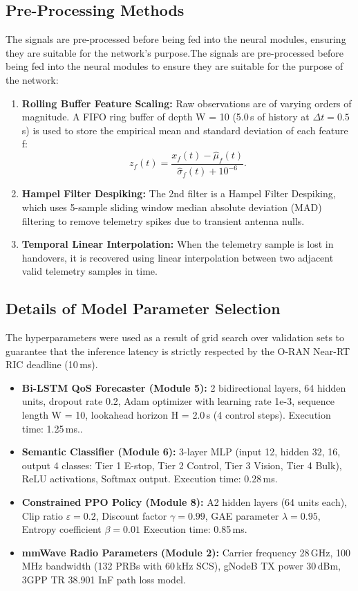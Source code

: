 \documentclass[twocolumn,10pt,twoside]{article}
\begin{document}
\subsection{Pre-Processing Methods}
The signals are pre-processed before being fed into the neural modules, ensuring they are suitable for the network's purpose.The signals are pre-processed before being fed into the neural modules to ensure they are suitable for the purpose of the network:
\begin{enumerate}
    \item \textbf{Rolling Buffer Feature Scaling:} Raw observations are of varying orders of magnitude. A FIFO ring buffer of depth W = 10 (5.0\,s of history at $\Delta t = 0.5$\,s) is used to store the empirical mean and standard deviation of each feature f:
\begin{equation}
z_f(t) = \frac{x_f(t) - \hat{\mu}_f(t)}{\hat{\sigma}_f(t) + 10^{-6}}.
\label{eq:rolling_scaling}
\end{equation}
    \item \textbf{Hampel Filter Despiking:} The 2nd filter is a Hampel Filter Despiking, which uses 5-sample sliding window median absolute deviation (MAD) filtering to remove telemetry spikes due to transient antenna nulls.
    \item \textbf{Temporal Linear Interpolation:} When the telemetry sample is lost in handovers, it is recovered using linear interpolation between two adjacent valid telemetry samples in time.
\end{enumerate}

\subsection{Details of Model Parameter Selection}
The hyperparameters were used as a result of grid search over validation sets to guarantee that the inference latency is strictly respected by the O-RAN Near-RT RIC deadline (10\,ms).
\begin{itemize}
    \item \textbf{Bi-LSTM QoS Forecaster (Module 5):} 2 bidirectional layers, 64 hidden units, dropout rate 0.2, Adam optimizer with learning rate 1e-3, sequence length W = 10, lookahead horizon H = 2.0\,s (4 control steps). Execution time: 1.25\,ms..
    \item \textbf{Semantic Classifier (Module 6):} 3-layer MLP (input 12, hidden 32, 16, output 4 classes: Tier 1 E-stop, Tier 2 Control, Tier 3 Vision, Tier 4 Bulk), ReLU activations, Softmax output. Execution time: 0.28\,ms.
    \item \textbf{Constrained PPO Policy (Module 8):} A2 hidden layers (64 units each), Clip ratio $\varepsilon = 0.2$, Discount factor $\gamma = 0.99$, GAE parameter $\lambda = 0.95$, Entropy coefficient $\beta = 0.01$ Execution time: 0.85\,ms.
    \item \textbf{mmWave Radio Parameters (Module 2):} Carrier frequency 28\,GHz, 100\,MHz bandwidth (132 PRBs with 60\,kHz SCS), gNodeB TX power 30\,dBm, 3GPP TR 38.901 InF path loss model.
\end{itemize}
\end{document}
